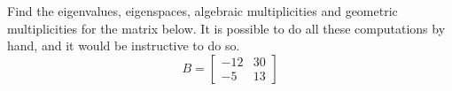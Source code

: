 Find the eigenvalues, eigenspaces, algebraic multiplicities and geometric multiplicities for the matrix below.  It is possible to do all these computations by hand, and it would be instructive to do so.
%
\begin{equation*}
B=
\begin{bmatrix}
-12&30\\-5&13
\end{bmatrix}
\end{equation*}